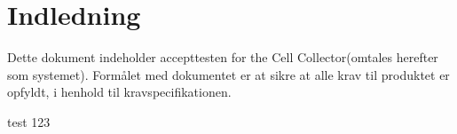 \section{Indledning}
Dette dokument indeholder accepttesten for the Cell Collector(omtales herefter som systemet). Formålet med dokumentet er at sikre at alle krav til produktet er opfyldt, i henhold til kravspecifikationen.

test 123